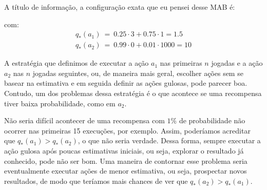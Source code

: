 \documentclass{article}
\begin{document}
            A título de informação, a configuração exata que eu pensei desse MAB é:
            \begin{center}
            \end{center}
            com:
            \begin{equation*}
            \begin{split}
                q_*(a_1) \ = \ 0.25 \cdot 3 + 0.75 \cdot 1 = 1.5 \\
                q_*(a_2) \ = \ 0.99 \cdot 0 + 0.01 \cdot 1000 = 10
            \end{split}                
            \end{equation*}

            A estratégia que definimos de executar a ação $a_1$ nas primeiras $n$ jogadas e a ação $a_2$ nas $n$ jogadas seguintes, ou, de maneira mais geral, escolher ações sem se basear na estimativa e em seguida definir as ações gulosas, pode parecer boa. Contudo, um dos problemas dessa estratégia é o que acontece se uma recompensa tiver baixa probabilidade, como em $a_2$. 

            Não seria difícil acontecer de uma recompensa com $1\%$ de probabilidade não ocorrer nas primeiras 15 execuções, por exemplo. Assim, poderíamos acreditar que $q_*(a_1) > q_*(a_2)$, o que não seria verdade. Dessa forma, sempre executar a ação gulosa após poucas estimativas iniciais, ou seja, explorar o resultado já conhecido, pode não ser bom. Uma maneira de contornar esse problema seria eventualmente executar ações de menor estimativa, ou seja, prospectar novos resultados, de modo que teríamos mais chances de ver que $q_*(a_2) > q_*(a_1)$.
\end{document}
